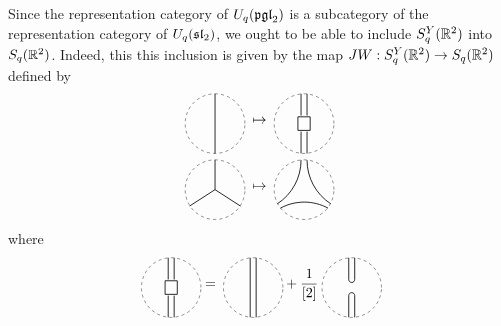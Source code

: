 Since the representation category of $U_q(\mathfrak{pgl}_2)$ is a
subcategory of the representation category of $U_q(\mathfrak{sl}_2)$,
we ought to be able to include $S_q^Y(\mathbb{R}^2)$ into $S_q(\mathbb{R}^2)$. Indeed, this
this inclusion is given by the map $JW: S_q^Y(\mathbb{R}^2) \to S_q(\mathbb{R}^2)$
defined by
 \begin{align*}
    \scalebox{0.75}{
    \begin{tikzpicture}[baseline=0]
        \draw[dashed] (0,0) circle (1);
        \draw[thick] (0,-1) -- (0,1);
    \end{tikzpicture}
    } & \mapsto 
    \scalebox{0.75}{
    \begin{tikzpicture}[baseline=0]
        \draw[dashed] (0,0) circle (1);
        \node at (0,0) [thick,rectangle,draw] {$\phantom{2}$};
        \draw[thick] (-0.1, 1) -- (-0.1,0.27);
        \draw[thick] (0.1, 1) -- (0.1,0.27);
        \draw[thick] (-0.1, -1) -- (-0.1,-0.27);
        \draw[thick] (0.1, -1) -- (0.1,-0.27);
    \end{tikzpicture}
    } \\
    \scalebox{0.75}{
    \begin{tikzpicture}[baseline=0]
        \draw[dashed] (0,0) circle (1);
        \draw[thick] (0,0) -- (0,1);
        \draw[thick] (0,0) -- (0.85,-0.55);
        \draw[thick] (0,0) -- (-0.85,-0.55);
    \end{tikzpicture}
    } & \mapsto
    \scalebox{0.75}{
    \begin{tikzpicture}[baseline=0]
        \draw[dashed] (0,0) circle (1);
        \draw[thick] (-0.1,0.99) arc (0:-56.8:1.75);
        \draw[thick] (0.1,0.99) arc (180:236.8:1.75);
        \draw[thick] (-0.79,-0.62) arc (118.5:61.6:1.67);
    \end{tikzpicture}
    }
\end{align*}
where
$$\scalebox{0.75}{
    \begin{tikzpicture}[baseline=0]
        \draw[dashed] (0,0) circle (1);
        \node at (0,0) [thick,rectangle,draw] {$\phantom{2}$};
        \draw[thick] (-0.1, 1) -- (-0.1,0.27);
        \draw[thick] (0.1, 1) -- (0.1,0.27);
        \draw[thick] (-0.1, -1) -- (-0.1,-0.27);
        \draw[thick] (0.1, -1) -- (0.1,-0.27);
    \end{tikzpicture}} = 
    \scalebox{0.75}{
    \begin{tikzpicture}[baseline=0]
        \draw[dashed] (0,0) circle (1);
        \draw[thick] (-0.1,1) -- (-0.1,-1);
        \draw[thick] (0.1,1) --(0.1,-1);
    \end{tikzpicture}} + \frac{1}{[2]} 
    \scalebox{0.75}{
    \begin{tikzpicture}[baseline=0]
        \draw[dashed] (0,0) circle (1);
        \draw[thick] (-0.1, 1) -- (-0.1,0.27);
        \draw[thick] (0.1, 1) -- (0.1,0.27);
        \draw[thick] (-0.1,0.27) arc (-180:0:0.1);
        \draw[thick] (-0.1, -1) -- (-0.1,-0.27);
        \draw[thick] (0.1, -1) -- (0.1,-0.27);
        \draw[thick] (-0.1,-0.27) arc (180:0:0.1);
    \end{tikzpicture}}
$$
